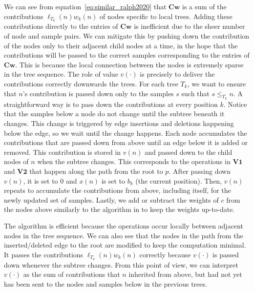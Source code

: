 We can see from equation~\eqref{eq:similar_ralph2020} that $\mathbf{C}\mathbf{w}$ is
a sum of the contributions $\ell_{T_k}(n)w_k(n)$ of nodes specific to local trees.
%
Adding these contributions directly to the entries of $\mathbf{C}\mathbf{w}$ is
inefficient due to the sheer number of node and sample pairs.
%
We can mitigate this by pushing down the contribution of the nodes only to their adjacent child nodes at a time,
in the hope that the contributions will be passed to the correct samples corresponding to the entries of $\mathbf{C}\mathbf{w}$.
%
This is because the local connection between the nodes is extremely sparse in the tree sequence.
The role of value $v(\cdot)$ is precisely to deliver the contributions correctly downwards the trees.
%
For each tree $T_k$, we want to ensure that $n$'s contribution is passed down only to
the samples $s$ such that $s \le_{T_k} n$.
%
A straightforward way is to pass down the contributions at every position $k$.
%
Notice that the samples below a node do not change until the subtree beneath it changes.
%
This change is triggered by edge insertions and deletions happening below the edge,
so we wait until the change happens.
%
Each node accumulates the contributions that are passed down from above
until an edge below it is added or removed.
%
This contribution is stored in $v(n)$ and passed down to the child nodes of $n$ when the subtree changes.
%
This corresponds to the operations in $\mathbf{V1}$ and $\mathbf{V2}$
that happen along the path from the root to $p$.
%
After passing down $v(n)$, it is set to $0$ and $x(n)$ is set to $b_k$ (the current position).
%
Then, $v(n)$ repeats to accumulate the contributions from above, including itself,
for the newly updated set of samples.
%
Lastly, we add or subtract the weights of $c$ from the nodes above similarly to
the algorithm in \citet{ralph2020efficiently} to keep the weights up-to-date.

The algorithm is efficient because the operations occur locally between adjacent nodes in the tree sequence.
%
We can also see that the nodes in the path from the inserted/deleted edge to the root are
modified to keep the computation minimal.
%
It passes the contributions $\ell_{T_k}(n)w_k(n)$ correctly because
$v(\cdot)$ is passed down whenever the subtree changes.
%
From this point of view, we can interpret $v(\cdot)$ as the sum of contributions that $n$ inherited from above,
but had not yet has been sent to the nodes and samples below in the previous trees.

